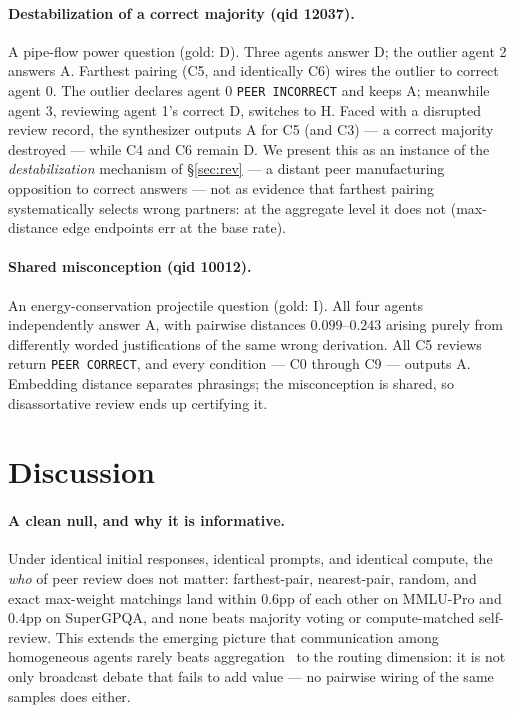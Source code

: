 \documentclass[11pt]{article}
\begin{document}
\paragraph{Destabilization of a correct majority (qid 12037).}
A pipe-flow power question (gold: D). Three agents answer D; the outlier agent 2 answers A. Farthest pairing (C5, and identically C6) wires the outlier to correct agent 0. The outlier declares agent 0 \texttt{PEER INCORRECT} and keeps A; meanwhile agent 3, reviewing agent 1's correct D, switches to H. Faced with a disrupted review record, the synthesizer outputs A for C5 (and C3) --- a correct majority destroyed --- while C4 and C6 remain D. We present this as an instance of the \emph{destabilization} mechanism of \S\ref{sec:rev} --- a distant peer manufacturing opposition to correct answers --- not as evidence that farthest pairing systematically selects wrong partners: at the aggregate level it does not (max-distance edge endpoints err at the base rate).

\paragraph{Shared misconception (qid 10012).}
An energy-conservation projectile question (gold: I). All four agents independently answer A, with pairwise distances $0.099$--$0.243$ arising purely from differently worded justifications of the same wrong derivation. All C5 reviews return \texttt{PEER CORRECT}, and every condition --- C0 through C9 --- outputs A. Embedding distance separates phrasings; the misconception is shared, so disassortative review ends up certifying it.

\section{Discussion}
\label{sec:discussion}

\paragraph{A clean null, and why it is informative.}
Under identical initial responses, identical prompts, and identical compute, the \emph{who} of peer review does not matter: farthest-pair, nearest-pair, random, and exact max-weight matchings land within 0.6pp of each other on MMLU-Pro and 0.4pp on SuperGPQA, and none beats majority voting or compute-matched self-review. This extends the emerging picture that communication among homogeneous agents rarely beats aggregation~\cite{yang2025revisiting,choi2025debateorvote} to the routing dimension: it is not only broadcast debate that fails to add value --- no pairwise wiring of the same samples does either.
\end{document}
